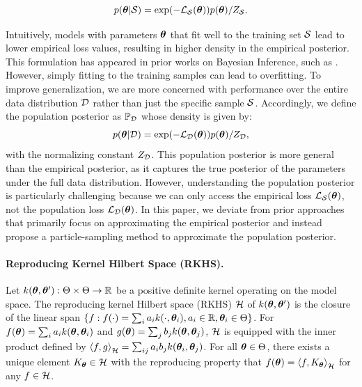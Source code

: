 \begin{equation*}
    p({\bm{\theta}}|{\mathcal{S}}) = \exp(-{\mathcal{L}}_{\mathcal{S}}({\bm{\theta}}))p({\bm{\theta}})/Z_{\mathcal{S}}.
\end{equation*}

Intuitively, models with parameters ${\bm{\theta}}$ that fit well to the training set ${\mathcal{S}}$ lead to lower empirical loss values, resulting in higher density in the empirical posterior. This formulation has appeared in prior works on Bayesian Inference, such as \cite{va2023_flat_Bayes}. However, simply fitting to the training samples can lead to overfitting. To improve generalization, we are more concerned with performance over the entire data distribution ${\mathcal{D}}$ rather than just the specific sample ${\mathcal{S}}$. Accordingly, we define the population posterior as $\mathbb{P}_{\mathcal{D}}$ whose density is given by:
\begin{equation}
\label{eq: population posterior}
    p({\bm{\theta}}| {\mathcal{D}}) = \exp(-{\mathcal{L}}_{\mathcal{D}}({\bm{\theta}}))p({\bm{\theta}})/Z_{\mathcal{D}},
\end{equation}
with the normalizing constant $Z_{\mathcal{D}}$. This population posterior is more general than the empirical posterior, as it captures the true posterior of the parameters under the full data distribution. However, understanding the population posterior is particularly challenging because we can only access the empirical loss ${\mathcal{L}}_{\mathcal{S}}({\bm{\theta}})$, not the population loss ${\mathcal{L}}_{\mathcal{D}}({\bm{\theta}})$. In this paper, we deviate from prior approaches that primarily focus on approximating the empirical posterior and instead propose a particle-sampling method to approximate the population posterior.
\vspace{-3mm}

\paragraph{Reproducing Kernel Hilbert Space (RKHS).} Let $k({\bm{\theta}}, {\bm{\theta}}'): \Theta \times \Theta \to \mathbb{R}$ be a positive definite kernel operating on the model space. The reproducing kernel Hilbert space (RKHS) ${\mathcal{H}}$ of $k({\bm{\theta}}, {\bm{\theta}}')$ is the closure of the linear span $\{f: f(\cdot) = \sum_{i} a_i k(\cdot, {\bm{\theta}}_i), a_i \in \mathbb{R}, {\bm{\theta}}_i \in \Theta\}$. For $f({\bm{\theta}}) = \sum_i a_i k({\bm{\theta}}, {\bm{\theta}}_i)$ and $g({\bm{\theta}}) = \sum_j b_j k({\bm{\theta}}, {\bm{\theta}}_j)$, ${\mathcal{H}}$ is equipped with the inner product defined by $\left<f, g\right>_{\mathcal{H}} = \sum_{ij}a_i b_j k({\bm{\theta}}_i, {\bm{\theta}}_j)$. For all ${\bm{\theta}} \in \Theta$, there exists a unique element $K_{\bm{\theta}} \in {\mathcal{H}}$ with the reproducing property that $f({\bm{\theta}}) = \left< f, K_{\bm{\theta}}\right>_{\mathcal{H}}$ for any $f \in {\mathcal{H}}$.


